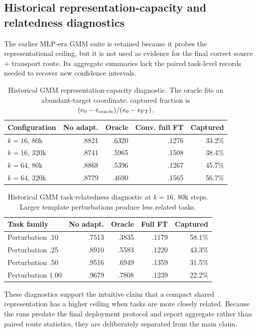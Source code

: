 \subsection{Historical representation-capacity and relatedness diagnostics}
The earlier MLP-era GMM suite is retained because it probes the representational ceiling, but it is not used as evidence for the final correct source $+$ transport route. Its aggregate summaries lack the paired task-level records needed to recover new confidence intervals.

\begin{table}[h]
\centering\small
\caption{Historical GMM representation-capacity diagnostic. The oracle fits an abundant-target coordinate; captured fraction is $(e_0-e_{\rm oracle})/(e_0-e_{\rm FT})$.}
\begin{tabular}{lrrrr}
\toprule
Configuration & No adapt. & Oracle & Conv. full FT & Captured\\
\midrule
$k=16$, 80k & .8821 & .6320 & .1276 & 33.2\%\\
$k=16$, 320k & .8741 & .5965 & .1508 & 38.4\%\\
$k=64$, 80k & .8868 & .5396 & .1267 & 45.7\%\\
$k=64$, 320k & .8779 & .4690 & .1565 & 56.7\%\\
\bottomrule
\end{tabular}
\end{table}

\begin{table}[h]
\centering\small
\caption{Historical GMM task-relatedness diagnostic at $k=16$, 80k steps. Larger template perturbations produce less related tasks.}
\begin{tabular}{lrrrr}
\toprule
Task family & No adapt. & Oracle & Full FT & Captured\\
\midrule
Perturbation .10 & .7513 & .3835 & .1179 & 58.1\%\\
Perturbation .25 & .8910 & .5583 & .1220 & 43.3\%\\
Perturbation .50 & .9516 & .6949 & .1359 & 31.5\%\\
Perturbation 1.00 & .9679 & .7808 & .1239 & 22.2\%\\
\bottomrule
\end{tabular}
\end{table}

These diagnostics support the intuitive claim that a compact shared representation has a higher ceiling when tasks are more closely related. Because the runs predate the final deployment protocol and report aggregate rather than paired route statistics, they are deliberately separated from the main claim.

